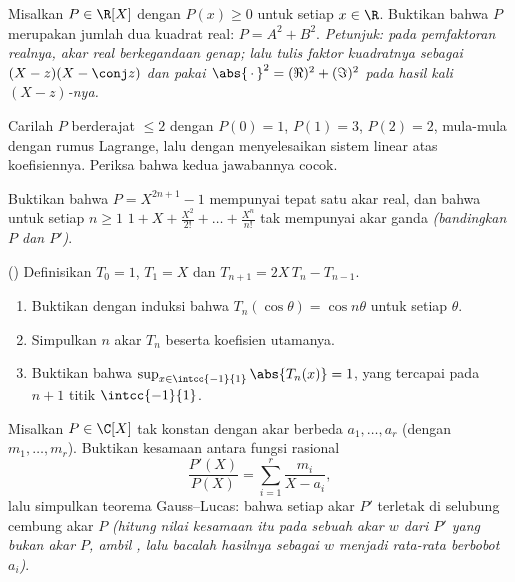 \begin{exercise}[$\star\star$]\label{exo:b1:poly:7}
Misalkan $P \in \R[X]$ dengan $P(x) \geq 0$ untuk setiap $x \in \R$. Buktikan bahwa
$P$ merupakan jumlah dua kuadrat  real: $P = A^2 + B^2$.
\emph{Petunjuk: pada pemfaktoran realnya, akar real berkegandaan
genap; lalu tulis faktor kuadratnya sebagai $(X - z)(X - \conj z)$
dan pakai $\abs{\,\cdot\,}^2 = (\Re)^2 + (\Im)^2$ pada hasil kali
$(X - z)$-nya.}
\end{exercise}

\begin{exercise}[$\star\star$]\label{exo:b1:poly:8}
Carilah  $P$ berderajat $\leq 2$ dengan $P(0) = 1$, $P(1) =
3$, $P(2) = 2$, mula-mula dengan rumus Lagrange, lalu dengan menyelesaikan
sistem linear atas koefisiennya. Periksa bahwa kedua jawabannya cocok.
\end{exercise}

\begin{exercise}[$\star\star$]\label{exo:b1:poly:9}
Buktikan bahwa $P = X^{2n+1} - 1$ mempunyai tepat satu akar real, dan bahwa untuk
setiap $n \geq 1$  $1 + X + \frac{X^2}{2!} + \dots +
\frac{X^n}{n!}$ tak mempunyai akar ganda \emph{(bandingkan $P$ dan
$P'$)}.
\end{exercise}

\begin{exercise}[$\star\star\star$]\label{exo:b1:poly:10}
() Definisikan $T_0 = 1$, $T_1 = X$ dan $T_{n+1} =
2X\,T_n - T_{n-1}$.
\begin{enumerate}
  \item Buktikan dengan induksi bahwa $T_n(\cos\theta) = \cos n\theta$ untuk
        setiap $\theta$.
  \item Simpulkan $n$ akar $T_n$ beserta koefisien utamanya.
  \item Buktikan bahwa $\sup_{x \in \intcc{-1}{1}} \abs{T_n(x)} = 1$,
        yang tercapai pada $n + 1$ titik $\intcc{-1}{1}$.
\end{enumerate}
\end{exercise}

\begin{exercise}[$\star\star\star$]\label{exo:b1:poly:11}
Misalkan $P \in \C[X]$ tak konstan dengan akar berbeda $a_1, \dots,
a_r$ (dengan  $m_1, \dots, m_r$). Buktikan kesamaan antara
fungsi rasional
\[
\frac{P'(X)}{P(X)} = \sum_{i=1}^{r} \frac{m_i}{X - a_i},
\]
lalu simpulkan teorema Gauss--Lucas: bahwa setiap akar $P'$ terletak di
selubung cembung akar $P$ \emph{(hitung nilai kesamaan itu pada sebuah
akar $w$ dari $P'$ yang bukan akar $P$, ambil , lalu
bacalah hasilnya sebagai $w$ menjadi rata-rata berbobot $a_i$)}.
\end{exercise}

